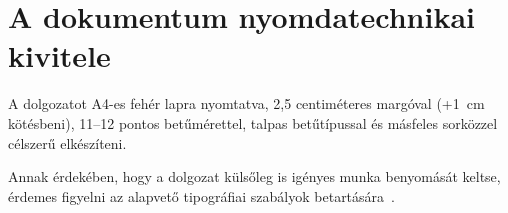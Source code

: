 \section{A dokumentum nyomdatechnikai kivitele}
A dolgozatot A4-es fehér lapra nyomtatva, 2,5 centiméteres margóval (+1~cm kötésbeni), 11--12 pontos betűmérettel, talpas betűtípussal és másfeles sorközzel célszerű elkészíteni.

Annak érdekében, hogy a dolgozat külsőleg is igényes munka benyomását keltse, érdemes figyelni az\cite{Wettl04} alapvető tipográfiai szabályok betartására~\cite{Jeney}.
